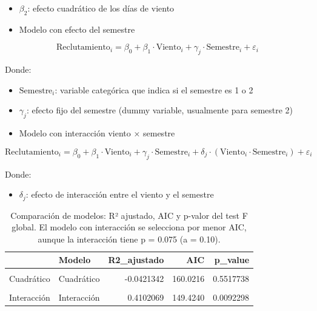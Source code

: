 \documentclass[
]{article}
\providecommand{\tightlist}{%
  \setlength{\itemsep}{0pt}\setlength{\parskip}{0pt}}
\begin{document}
\begin{itemize}
\item
  \(\beta_2\): efecto cuadrático de los días de viento
\item
  Modelo con efecto del semestre
\end{itemize}

\[
\text{Reclutamiento}_i = \beta_0 + \beta_1 \cdot \text{Viento}_i + \gamma_j \cdot \text{Semestre}_i + \varepsilon_i
\]

Donde:

\begin{itemize}
\item
  \(\text{Semestre}_i\): variable categórica que indica si el semestre es 1 o 2
\item
  \(\gamma_j\): efecto fijo del semestre (dummy variable, usualmente para semestre 2)
\item
  Modelo con interacción viento × semestre
\end{itemize}

\[
\text{Reclutamiento}_i = \beta_0 + \beta_1 \cdot \text{Viento}_i + \gamma_j \cdot \text{Semestre}_i + \delta_j \cdot (\text{Viento}_i \cdot \text{Semestre}_i) + \varepsilon_i
\]

Donde:

\begin{itemize}
\tightlist
\item
  \(\delta_j\): efecto de interacción entre el viento y el semestre
\end{itemize}

\begin{table}[!h]
\centering
\caption{\label{tab:unnamed-chunk-9}Comparación de modelos: R² ajustado, AIC y p-valor del test F global. El modelo con interacción se selecciona por menor AIC, aunque la interacción tiene p = 0.075 (a = 0.10).}
\centering
\begin{tabular}[t]{l|l|r|r|r}
\hline
  & Modelo & R2\_ajustado & AIC & p\_value\\
\hline
\cellcolor{gray!10}{Lineal} & \cellcolor{gray!10}{Lineal} & \cellcolor{gray!10}{-0.0297745} & \cellcolor{gray!10}{158.9262} & \cellcolor{gray!10}{0.5105547}\\
\hline
Cuadrático & Cuadrático & -0.0421342 & 160.0216 & 0.5517738\\
\hline
\cellcolor{gray!10}{Con semestre} & \cellcolor{gray!10}{Con semestre} & \cellcolor{gray!10}{0.3187816} & \cellcolor{gray!10}{151.5188} & \cellcolor{gray!10}{0.0148711}\\
\hline
Interacción & Interacción & 0.4102069 & 149.4240 & 0.0092298\\
\hline
\end{tabular}
\end{table}
\end{document}
